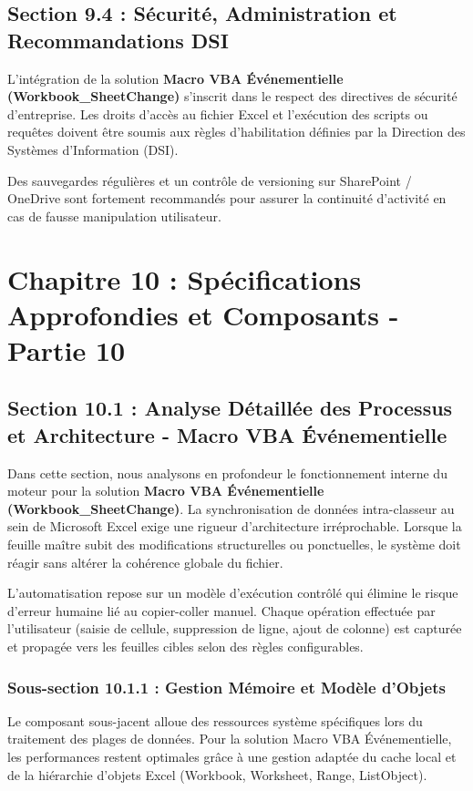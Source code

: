 \documentclass[12pt,a4paper]{report}
\begin{document}
\section{Section 9.4 : Sécurité, Administration et Recommandations DSI}
L'intégration de la solution \textbf{Macro VBA Événementielle (Workbook\_SheetChange)} s'inscrit dans le respect des directives de sécurité d'entreprise. Les droits d'accès au fichier Excel et l'exécution des scripts ou requêtes doivent être soumis aux règles d'habilitation définies par la Direction des Systèmes d'Information (DSI).

Des sauvegardes régulières et un contrôle de versioning sur SharePoint / OneDrive sont fortement recommandés pour assurer la continuité d'activité en cas de fausse manipulation utilisateur.


\chapter{Chapitre 10 : Spécifications Approfondies et Composants - Partie 10}

\section{Section 10.1 : Analyse Détaillée des Processus et Architecture - Macro VBA Événementielle}
Dans cette section, nous analysons en profondeur le fonctionnement interne du moteur pour la solution \textbf{Macro VBA Événementielle (Workbook\_SheetChange)}. La synchronisation de données intra-classeur au sein de Microsoft Excel exige une rigueur d'architecture irréprochable. Lorsque la feuille maître subit des modifications structurelles ou ponctuelles, le système doit réagir sans altérer la cohérence globale du fichier.

L'automatisation repose sur un modèle d'exécution contrôlé qui élimine le risque d'erreur humaine lié au copier-coller manuel. Chaque opération effectuée par l'utilisateur (saisie de cellule, suppression de ligne, ajout de colonne) est capturée et propagée vers les feuilles cibles selon des règles configurables.


\subsection{Sous-section 10.1.1 : Gestion Mémoire et Modèle d'Objets}
Le composant sous-jacent alloue des ressources système spécifiques lors du traitement des plages de données. Pour la solution Macro VBA Événementielle, les performances restent optimales grâce à une gestion adaptée du cache local et de la hiérarchie d'objets Excel (Workbook, Worksheet, Range, ListObject).
\end{document}
